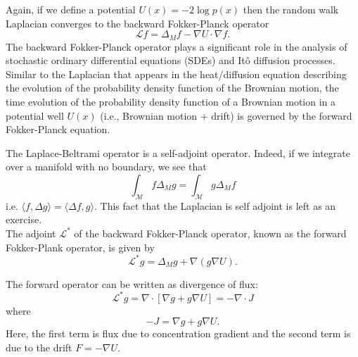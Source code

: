 Again, if we define a potential $U(x) = -2\log p(x)$ then the random walk Laplacian converges to the backward Fokker-Planck operator
$$\mathcal{L}f = \Delta_M f - \nabla U \cdot \nabla f.$$
The backward Fokker-Planck operator plays a significant role in the analysis of stochastic ordinary differential equations (SDEs) and It\^o diffusion processes. Similar to the Laplacian that appears in the heat/diffusion equation describing the evolution of the probability density function of the Brownian motion, the time evolution of the probability density function of a Brownian motion in a potential well $U(x)$ (i.e., Brownian motion + drift)  is governed by the forward Fokker-Planck equation.

The Laplace-Beltrami operator is a self-adjoint operator. Indeed, if we integrate over a manifold with no boundary, we see that
\[
\int_\mathcal{M} f \Delta_M g = \int_\mathcal{M} g \Delta_M f
\]
i.e. $\langle f, \Delta g \rangle = \langle \Delta f, g \rangle$.
This fact that the Laplacian is self adjoint is left as an exercise.\\

The adjoint $\mathcal{L}^*$ of the backward Fokker-Planck operator, known as the forward Fokker-Plank operator, is given by
\[
\mathcal{L}^*g = \Delta_M g + \nabla ( g \nabla U ).
\]

The forward operator can be written as divergence of flux:
$$\mathcal{L}^* g = \nabla \cdot \left[\nabla g + g\nabla U \right] = -\nabla \cdot J$$
where
$$-J = \nabla g + g\nabla U.$$
Here, the first term is flux due to concentration gradient and the second term is due to the drift $F = -\nabla U$.

